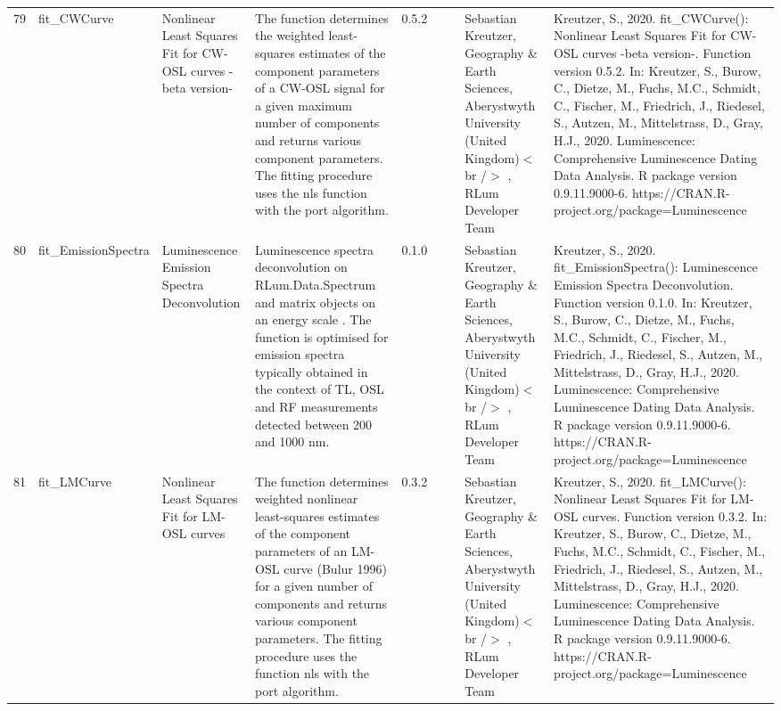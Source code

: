 \begin{table}[ht]
\begin{tabular}{rllllllll}
 \\ 
  79 & fit\_CWCurve & Nonlinear Least Squares Fit for CW-OSL curves -beta version- & The function determines the weighted least-squares estimates of the component parameters of a CW-OSL signal for a given maximum number of components and returns various component parameters. The fitting procedure uses the  nls  function with the  port  algorithm. & 0.5.2
 &  &  & Sebastian Kreutzer, Geography \& Earth Sciences, Aberystwyth University (United Kingdom)$<$br /$>$ , RLum Developer Team & Kreutzer, S., 2020. fit\_CWCurve(): Nonlinear Least Squares Fit for CW-OSL curves -beta version-. Function version 0.5.2. In: Kreutzer, S., Burow, C., Dietze, M., Fuchs, M.C., Schmidt, C., Fischer, M., Friedrich, J., Riedesel, S., Autzen, M., Mittelstrass, D., Gray, H.J., 2020. Luminescence: Comprehensive Luminescence Dating Data Analysis. R package version 0.9.11.9000-6. https://CRAN.R-project.org/package=Luminescence
 \\ 
  80 & fit\_EmissionSpectra & Luminescence Emission Spectra Deconvolution & Luminescence spectra deconvolution on  RLum.Data.Spectrum  and  matrix  objects on an  energy scale . The function is optimised for emission spectra typically obtained in the context of TL, OSL and RF measurements detected between 200 and 1000 nm. & 0.1.0
 &  &  & Sebastian Kreutzer, Geography \& Earth Sciences, Aberystwyth University (United Kingdom)$<$br /$>$ , RLum Developer Team & Kreutzer, S., 2020. fit\_EmissionSpectra(): Luminescence Emission Spectra Deconvolution. Function version 0.1.0. In: Kreutzer, S., Burow, C., Dietze, M., Fuchs, M.C., Schmidt, C., Fischer, M., Friedrich, J., Riedesel, S., Autzen, M., Mittelstrass, D., Gray, H.J., 2020. Luminescence: Comprehensive Luminescence Dating Data Analysis. R package version 0.9.11.9000-6. https://CRAN.R-project.org/package=Luminescence
 \\ 
  81 & fit\_LMCurve & Nonlinear Least Squares Fit for LM-OSL curves & The function determines weighted nonlinear least-squares estimates of the component parameters of an LM-OSL curve (Bulur 1996) for a given number of components and returns various component parameters. The fitting procedure uses the function  nls  with the  port  algorithm. & 0.3.2
 &  &  & Sebastian Kreutzer, Geography \& Earth Sciences, Aberystwyth University (United Kingdom)$<$br /$>$ , RLum Developer Team & Kreutzer, S., 2020. fit\_LMCurve(): Nonlinear Least Squares Fit for LM-OSL curves. Function version 0.3.2. In: Kreutzer, S., Burow, C., Dietze, M., Fuchs, M.C., Schmidt, C., Fischer, M., Friedrich, J., Riedesel, S., Autzen, M., Mittelstrass, D., Gray, H.J., 2020. Luminescence: Comprehensive Luminescence Dating Data Analysis. R package version 0.9.11.9000-6. https://CRAN.R-project.org/package=Luminescence

\end{tabular}
\end{table}
